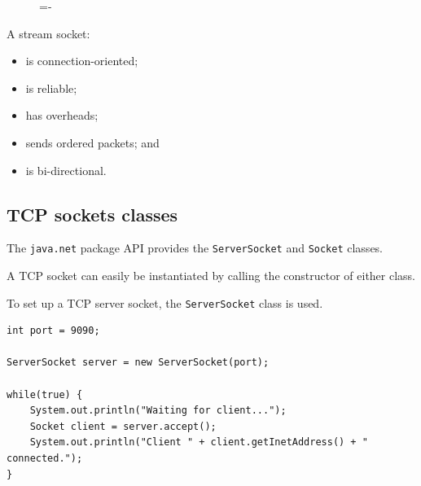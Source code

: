 \documentclass[a4paper]{systems-software}
\begin{document}
\begin{figure}[H]
	\lineskip=-\fboxrule
\end{figure}

A stream socket:
\begin{itemize}
	\item is connection-oriented;
	\item is reliable;
	\item has overheads;
	\item sends ordered packets; and
	\item is bi-directional.
\end{itemize}


\subsection*{TCP sockets classes}

The \texttt{java.net} package API provides the \texttt{ServerSocket} and \texttt{Socket} classes.

A TCP socket can easily be instantiated by calling the constructor of either class.

To set up a TCP server socket, the \texttt{ServerSocket} class is used.

\begin{lstlisting}[title={Server: setting up a ServerSocket and accepting client connections.}]
int port = 9090;

ServerSocket server = new ServerSocket(port);

while(true) {
	System.out.println("Waiting for client...");
	Socket client = server.accept();
	System.out.println("Client " + client.getInetAddress() + " connected.");
}
\end{lstlisting}
\end{document}
